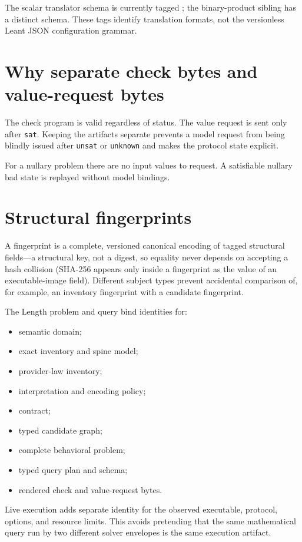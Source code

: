 \documentclass[10pt,letterpaper,oneside]{report}
\newcommand{\code}[1]{\texttt{\detokenize{#1}}}
\newcommand{\sat}{\texttt{sat}}
\newcommand{\unsat}{\texttt{unsat}}
\newcommand{\unknown}{\texttt{unknown}}
\begin{document}
The scalar translator schema is currently tagged \code{djex-length-z3-qf-lia-smtlib2/v2}; the binary-product sibling has a distinct schema. These tags identify translation formats, not the versionless Leant JSON configuration grammar.

\section{Why separate check bytes and value-request bytes}

The check program is valid regardless of status. The value request is sent only after \sat. Keeping the artifacts separate prevents a model request from being blindly issued after \unsat{} or \unknown{} and makes the protocol state explicit.

For a nullary problem there are no input values to request. A satisfiable nullary bad state is replayed without model bindings.

\section{Structural fingerprints}

A fingerprint is a complete, versioned canonical encoding of tagged structural fields---a structural key, not a digest, so equality never depends on accepting a hash collision (SHA-256 appears only inside a fingerprint as the value of an executable-image field). Different subject types prevent accidental comparison of, for example, an inventory fingerprint with a candidate fingerprint.

The Length problem and query bind identities for:

\begin{itemize}
\item semantic domain;
\item exact inventory and spine model;
\item provider-law inventory;
\item interpretation and encoding policy;
\item contract;
\item typed candidate graph;
\item complete behavioral problem;
\item typed query plan and schema;
\item rendered check and value-request bytes.
\end{itemize}

Live execution adds separate identity for the observed executable, protocol, options, and resource limits. This avoids pretending that the same mathematical query run by two different solver envelopes is the same execution artifact.
\end{document}
